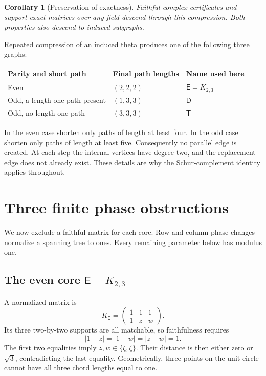 \documentclass[11pt]{article}
\numberwithin{equation}{section}
\newtheorem{corollary}[theorem]{Corollary}
\theoremstyle{definition}
\newcommand{\Ecore}{\mathsf E}\newcommand{\Dcore}{\mathsf D}\newcommand{\Tcore}{\mathsf T}
\begin{document}
\begin{corollary}[Preservation of exactness]
\label{cac:cor:compress}
Faithful complex certificates and support-exact matrices over any field descend through this compression. Both properties also descend to induced subgraphs.
\end{corollary}

Repeated compression of an induced theta produces one of the following three graphs:
\begin{center}
\begin{tabular}{@{}lll@{}}\toprule
Parity and short path & Final path lengths & Name used here\\\midrule
Even & $(2,2,2)$ & $\Ecore=K_{2,3}$\\
Odd, a length-one path present & $(1,3,3)$ & $\Dcore$\\
Odd, no length-one path & $(3,3,3)$ & $\Tcore$\\\bottomrule
\end{tabular}
\end{center}
In the even case shorten only paths of length at least four. In the odd case shorten only paths of length at least five. Consequently no parallel edge is created. At each step the internal vertices have degree two, and the replacement edge does not already exist. These details are why the Schur-complement identity applies throughout.

\section{Three finite phase obstructions}
\label{cac:sec:cores}

We now exclude a faithful matrix for each core. Row and column phase changes normalize a spanning tree to ones. Every remaining parameter below has modulus one.

\subsection{The even core \texorpdfstring{$\Ecore=K_{2,3}$}{E = K2,3}}
A normalized matrix is
\begin{equation}
 K_{\Ecore}=\begin{pmatrix}1&1&1\\1&z&w\end{pmatrix}.
 \label{cac:eq:E}
\end{equation}
Its three two-by-two supports are all matchable, so faithfulness requires
\[
 |1-z|=|1-w|=|z-w|=1.
\]
The first two equalities imply $z,w\in\{\zeta,\overline\zeta\}$. Their distance is then either zero or $\sqrt3$, contradicting the last equality. Geometrically, three points on the unit circle cannot have all three chord lengths equal to one.
\end{document}
